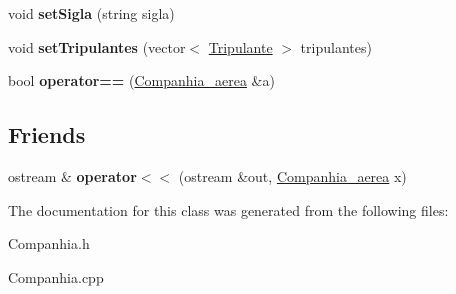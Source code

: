 \begin{DoxyCompactItemize}
\item 
\hypertarget{class_companhia__aerea_a0742925f0c896dc2ce24baa8b70a9562}{
void {\bfseries setSigla} (string sigla)}
\label{class_companhia__aerea_a0742925f0c896dc2ce24baa8b70a9562}

\item 
\hypertarget{class_companhia__aerea_aeee2c3f15b64540dd3cf22df39564e55}{
void {\bfseries setTripulantes} (vector$<$ \hyperlink{class_tripulante}{Tripulante} $>$ tripulantes)}
\label{class_companhia__aerea_aeee2c3f15b64540dd3cf22df39564e55}

\item 
\hypertarget{class_companhia__aerea_a33e5d072f5db05a503baace59cb45640}{
bool {\bfseries operator==} (\hyperlink{class_companhia__aerea}{Companhia\_\-aerea} \&a)}
\label{class_companhia__aerea_a33e5d072f5db05a503baace59cb45640}

\end{DoxyCompactItemize}
\subsection*{Friends}
\begin{DoxyCompactItemize}
\item 
\hypertarget{class_companhia__aerea_a57c645e28edec2637aea0c24170cbd30}{
ostream \& {\bfseries operator$<$$<$} (ostream \&out, \hyperlink{class_companhia__aerea}{Companhia\_\-aerea} x)}
\label{class_companhia__aerea_a57c645e28edec2637aea0c24170cbd30}

\end{DoxyCompactItemize}


The documentation for this class was generated from the following files:\begin{DoxyCompactItemize}
\item 
Companhia.h\item 
Companhia.cpp\end{DoxyCompactItemize}
